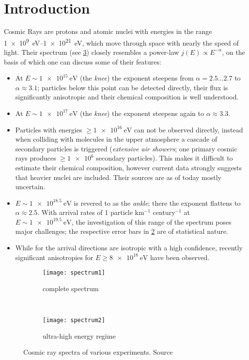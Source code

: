 \section{Introduction}
Cosmic Rays are protons and atomic nuclei with energies in the range
\SIrange{1e9}{1e21}{\electronvolt}, which move through space with nearly the
speed of light. Their spectrum (see \cref{fig:cr-whole-spectrum}) closely
resembles a power-law $j(E)\propto E^{-\alpha}$, on the basis of which one
can discuss some of their features:
\begin{itemize}
    \item At $E\sim\SI{1e15}{\electronvolt}$ (the \emph{knee}) the exponent
        steepens from $\alpha={2.5}\ldots{2.7}$ to $\alpha\approx3.1$;
        particles below this point can be detected directly, their flux is
        significantly anisotropic and their chemical composition is well
        understood.
    \item At $E\sim\SI{1e17}{\electronvolt}$ (the \emph{ knee}) the
        exponent steepens again to $\alpha\approx3.3$.
    \item Particles with energies $\ge\SI{1e16}{\electronvolt}$ can not be
        observed directly, instead when colliding with molecules in the upper
        atmosphere a cascade of secondary particles is triggered
        (\emph{extensive air showers}; one primary cosmic rays produces
        $\ge\num{1e6}$ secondary particles). This makes it difficult to
        estimate their chemical composition, however current data strongly
        suggests that heavier nuclei are included. Their sources are as of
        today mostly uncertain.
    \item $E\sim\SI{1e18.5}{\electronvolt}$ is revered to as the \emph{ankle};
        there the exponent flattens to $\alpha\approx2.5$. With arrival rates
        of 1 particle km$^{-1}$ century$^{-1}$ at
        $E\sim\SI{1e19.5}{\electronvolt}$, the investigation of this range of
        the spectrum poses major challenges; the respective error bars in
        \cref{fig:cr-whole-spectrum-high} are of statistical nature.
    \item While for  the arrival
        directions are isotropic with a high confidence, recently
        significant anisotropies for $E\ge\SI{8e18}{\electronvolt}$ have been
        observed.
\end{itemize}

\begin{figure}[ht]
    \centering
    \begin{subfigure}[b]{.45\textwidth}
        \texttt{[image: spectrum1]}
        \caption{complete spectrum}
        \label{fig:cr-whole-spectrum-all}
    \end{subfigure}
    ~
    \begin{subfigure}[b]{.45\textwidth}
        \texttt{[image: spectrum2]}
        \caption{ultra-high energy regime}
        \label{fig:cr-whole-spectrum-high}
    \end{subfigure}
    \caption{Cosmic ray spectra of various experiments.
        Source\autocite{spectrum}}
    \label{fig:cr-whole-spectrum}
\end{figure}

